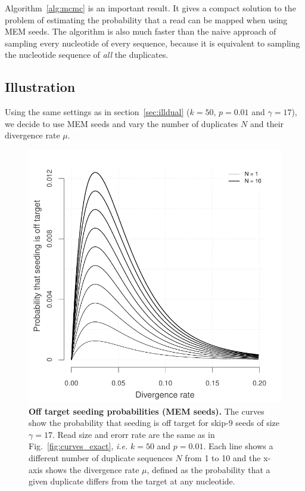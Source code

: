 \documentclass{article}
\begin{document}
Algorithm~\ref{alg:mcmc} is an important result. It gives a compact
solution to the problem of estimating the probability that a read can be
mapped when using MEM seeds. The algorithm is also much faster than the
naive approach of sampling every nucleotide of every sequence, because it
is equivalent to sampling the nucleotide sequence of \emph{all} the
duplicates.

\subsection{Illustration}
\label{sec:illmem}

Using the same settings as in section~\ref{sec:illdual} ($k=50$, $p=0.01$
and $\gamma=17$), we decide to use MEM seeds and vary the number of
duplicates $N$ and their divergence rate $\mu$.

\begin{figure}[h]
\centering
\includegraphics[scale=0.65]{curves_mem.pdf}
\caption{\textbf{Off target seeding probabilities (MEM seeds).}
The curves show the probability that seeding is off target for skip-9
seeds of size $\gamma=17$. Read size and erorr rate are the same as in
Fig.~\ref{fig:curves_exact}, \textit{i.e.} $k=50$ and $p=0.01$. Each line
shows a different number of duplicate sequences $N$ from 1 to 10 and the
x-axis shows the divergence rate $\mu$, defined as the probability that a
given duplicate differs from the target at any nucleotide.}
\label{fig:curves_mem}
\end{figure}
\end{document}
